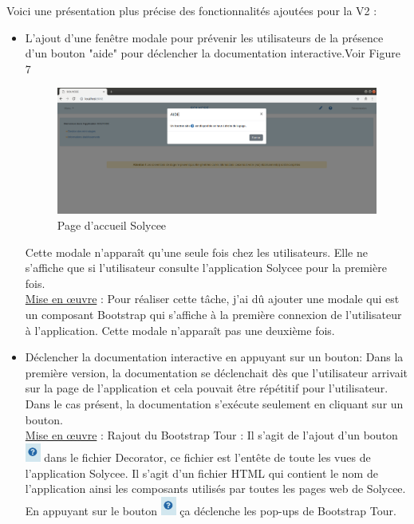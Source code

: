 \documentclass[12pt]{article}
\begin{document}
\begin{enumerate}
Voici une présentation plus précise des fonctionnalités ajoutées pour la V2 :

\begin{itemize}
\item  L'ajout d'une fenêtre modale pour prévenir les utilisateurs de la présence d'un bouton "aide" pour déclencher la documentation interactive.Voir Figure 7

\begin{figure}[H]
	\centering
 		\includegraphics[width=1\textwidth]{diagrammes/aide_modal.png}
  		\caption{Page d'accueil Solycee}
	\end{figure}
Cette modale n'apparaît qu'une seule fois chez les utilisateurs. Elle ne s'affiche que si l'utilisateur consulte l'application Solycee pour la première fois. \\ 


\underline{Mise en œuvre} :
Pour réaliser cette tâche, j'ai dû ajouter une modale qui est un composant Bootstrap qui s'affiche à la première connexion de l'utilisateur à l'application. Cette modale n'apparaît pas une deuxième fois. \\ 

   
\item  Déclencher la documentation interactive en appuyant sur un bouton: Dans la première version, la documentation se déclenchait dès que l'utilisateur arrivait sur la page de l'application et cela pouvait être répétitif pour l'utilisateur. Dans le cas présent, la documentation s'exécute seulement en cliquant sur un bouton. \\ 

\underline{Mise en œuvre} :
Rajout du Bootstrap Tour : Il s'agit de l'ajout d'un bouton \includegraphics[width=5mm,scale=0.5]{diagrammes/Bouton_aideDispo.png} dans le fichier Decorator, ce fichier est l'entête de toute les vues de l'application Solycee. Il s'agit d'un fichier HTML qui contient le nom de l'application ainsi les composants utilisés par toutes les pages web de Solycee. En appuyant sur le bouton \includegraphics[width=5mm,scale=0.5]{diagrammes/Bouton_aideDispo.png} ça déclenche les pop-ups de Bootstrap Tour. 
 

\end{itemize}
\end{enumerate}
\end{document}

